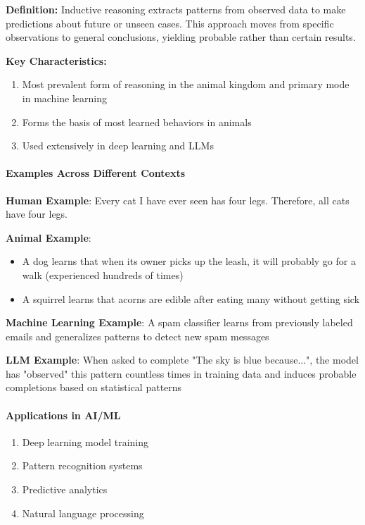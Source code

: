\textbf{Definition:} Inductive reasoning extracts patterns from observed data to make predictions about future or unseen cases. This approach moves from specific observations to general conclusions, yielding probable rather than certain results.

\textbf{Key Characteristics:}

\begin{enumerate}
\item Most prevalent form of reasoning in the animal kingdom and primary mode in machine learning
\item Forms the basis of most learned behaviors in animals  
\item Used extensively in deep learning and LLMs
\end{enumerate}

\paragraph{Examples Across Different Contexts}
\label{para:inductive-examples}

\textbf{Human Example}: Every cat I have ever seen has four legs. Therefore, all cats have four legs.

\textbf{Animal Example}:

\begin{itemize}
\item A dog learns that when its owner picks up the leash, it will probably go for a walk (experienced hundreds of times)
\item A squirrel learns that acorns are edible after eating many without getting sick
\end{itemize}

\textbf{Machine Learning Example}: A spam classifier learns from previously labeled emails and generalizes patterns to detect new spam messages

\textbf{LLM Example}: When asked to complete "The sky is blue because...", the model has "observed" this pattern countless times in training data and induces probable completions based on statistical patterns

\paragraph{Applications in AI/ML}
\label{para:inductive-applications}

\begin{enumerate}
\item Deep learning model training
\item Pattern recognition systems
\item Predictive analytics
\item Natural language processing
\end{enumerate}


